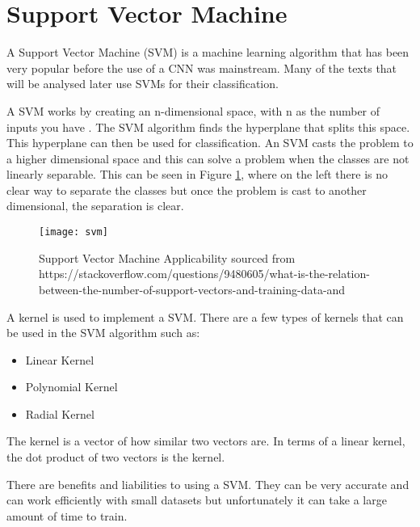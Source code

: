 \section{Support Vector Machine}
A Support Vector Machine (SVM) is a machine learning algorithm that has been
very popular before the use of a CNN was mainstream.
Many of the texts that will be analysed later use SVMs for their classification.

A SVM works by creating an n-dimensional space, with n as the number of
inputs you have \parencite{svm}. The SVM algorithm finds the hyperplane that splits this space.
This hyperplane can then be used for classification. 
An SVM casts the problem to a higher dimensional space and this can solve a problem when the classes are not linearly separable.
This can be seen in Figure \ref{fig:svm}, where on the left there is no clear way to separate the classes but once the problem is cast to another dimensional, the separation is clear.

\begin{figure}[h]
    \texttt{[image: svm]}
    \caption{Support Vector Machine Applicability sourced from https://stackoverflow.com/questions/9480605/what-is-the-relation-between-the-number-of-support-vectors-and-training-data-and}
    \label{fig:svm}
\end{figure}

A kernel is used to implement a SVM.
There are a few types of kernels that can be used in the SVM algorithm such as:
\begin{itemize}
	\item{Linear Kernel}
	\item{Polynomial Kernel}
	\item{Radial Kernel}
\end{itemize}
The kernel is a vector of how similar two vectors are.
In terms of a linear kernel, the dot product of two vectors is the kernel.

There are benefits and liabilities to using a SVM.
They can be very accurate and can work efficiently with small datasets but unfortunately it can take a large amount of time to train. 